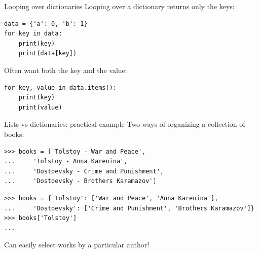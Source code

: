 \documentclass[aspectratio=169,usenames,dvipsnames]{beamer}
\begin{document}
\begin{frame}[fragile]{Looping over dictionaries}
Looping over a dictionary returns only the keys:
\begin{lstlisting}
data = {'a': 0, 'b': 1}
for key in data:
    print(key)
    print(data[key])
\end{lstlisting}

\pause
Often want both the key and the value:
\begin{lstlisting}
for key, value in data.items():
    print(key)
    print(value)
\end{lstlisting}
\end{frame}



\begin{frame}[fragile]{Lists vs dictionaries: practical example}
Two ways of organizing a collection of books:
\begin{lstlisting}
>>> books = ['Tolstoy - War and Peace',
...     'Tolstoy - Anna Karenina',
...     'Dostoevsky - Crime and Punishment',
...     'Dostoevsky - Brothers Karamazov']
\end{lstlisting}

\pause
\begin{lstlisting}
>>> books = {'Tolstoy': ['War and Peace', 'Anna Karenina'],
...     'Dostoevsky': ['Crime and Punishment', 'Brothers Karamazov']}
>>> books['Tolstoy']
...
\end{lstlisting}
Can easily select works by a particular author!
\end{frame}
\end{document}
